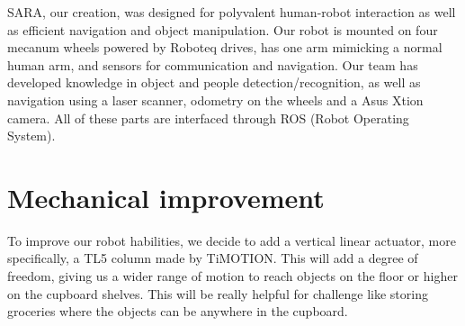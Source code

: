 \documentclass[runningheads,a4paper]{llncs}
\begin{document}
SARA, our creation, was designed for polyvalent human-robot interaction as well as efficient navigation and object manipulation. Our robot is mounted on four mecanum wheels powered by Roboteq drives, has one arm mimicking a normal human arm, and sensors for communication and navigation. Our team has developed knowledge in object and people detection/recognition, as well as navigation using a laser scanner, odometry on the wheels and a Asus Xtion camera. All of these parts are interfaced through ROS (Robot Operating System). \\

\section{Mechanical improvement}

\tab To improve our robot habilities, we decide to add a vertical linear actuator, more specifically, a TL5 column made by TiMOTION. This will add a degree of freedom, giving us a wider range of motion to reach objects on the floor or higher on the cupboard shelves. This will be really helpful for challenge like storing groceries where the objects can be anywhere in the cupboard. \\
\end{document}
